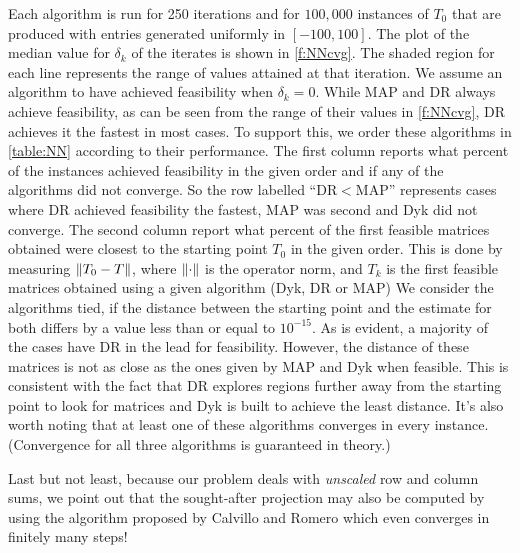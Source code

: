 \documentclass[12pt]{article}
\theoremstyle{definition}
\DeclarePairedDelimiter{\lVerts}{\lVert}{\rVert}
\newcommand{\norm}[1]{\ensuremath{\lVerts*{#1}}}
\begin{document}
{Each algorithm is run for 250 iterations and 
for $100,000$
instances of $T_0$ 
that are produced with entries generated uniformly in $[-100,100]$.
The plot of the median value for $\delta_k$ of the iterates is shown in \cref{f:NNcvg}. 
The shaded region for each line represents the range of values attained at that iteration. 
{We assume an algorithm to have achieved feasibility when $\delta_k=0$.}
While MAP and DR always achieve feasibility, 
{as can be seen from the range of their values in \cref{f:NNcvg}},
DR achieves it the fastest in most cases. 
To support this, we order these algorithms in \cref{table:NN} according to their performance. 
The first column reports what percent of the instances achieved feasibility 
in the given order and if any of the algorithms did not converge. 
So the row labelled ``DR$<$MAP'' represents cases where DR achieved feasibility the fastest, 
MAP was second and Dyk did not converge. 
The second column report what percent of the first feasible matrices obtained were closest to 
the starting point  {$T_0$} in the given order. 
 {
This is done by measuring $\norm{T_0-T}$,
where $\norm{\cdot}$ is the operator norm, and $T_k$ is the first feasible matrices obtained
using a given algorithm (Dyk, DR or MAP)
}
We consider the algorithms tied, 
if the distance between the starting point and the estimate for both 
differs by a value less than or equal to $10^{-15}$. 
As is evident, a majority of the cases have DR in the lead for feasibility. 
However, the distance of these matrices is not as close as the ones given by 
MAP and Dyk when feasible. This is consistent with the fact that 
DR explores regions further away from the starting point to look for matrices 
and Dyk is built to achieve the least distance. 
It's also worth noting that at least one of these algorithms converges in every instance. (Convergence for all three algorithms
is guaranteed in theory.)

{ 
Last but not least, because our problem 
deals with \emph{unscaled} row and column sums, we point out that the sought-after projection may also 
be computed by using the algorithm proposed by Calvillo and Romero 
\cite{CaRo} which even converges in finitely many steps!
}


}
\end{document}
